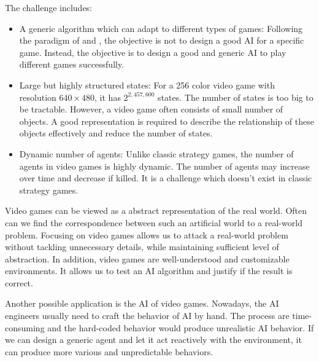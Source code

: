 The challenge includes:
\begin{itemize}{}

\item A generic algorithm which can adapt to different types of games:
Following the paradigm of \cite{GGP} and \cite{Yavar}, the objective is not to design a good AI for
a specific game. Instead, the objective is to design a good and generic AI to play different games successfully.

\item Large but highly structured states:
For a 256 color video game with resolution $640 \times 480$, it has $2^{2,457,600}$ states.
The number of states is too big to be tractable. However, a video game often consists of small number of objects.
A good representation is required to describe the relationship of these objects effectively and reduce
the number of states.

\item Dynamic number of agents:
Unlike classic strategy games, the number of agents in video games is highly dynamic.
The number of agents may increase over time and decrease if killed.
It is a challenge which doesn't exist in classic strategy games.
\end{itemize}

Video games can be viewed as a abstract representation of the real world. Often can we find the 
correspondence between such an artificial world to a real-world problem\cite{KeepAway}.
Focusing on video games allows us to attack a real-world problem without tackling unnecessary details, while maintaining sufficient 
level of abstraction. In addition, video games are well-understood and customizable environments. 
It allows us to test an AI algorithm and justify if the result is correct\cite{Yavar}.

Another possible application is the AI of video games.
Nowadays, the AI engineers usually need to craft the behavior of AI by hand. 
The process are time-consuming and the hard-coded behavior would produce unrealistic AI behavior.
If we can design a generic agent and let it act reactively with the environment, it can produce 
more various and unpredictable behaviors.





